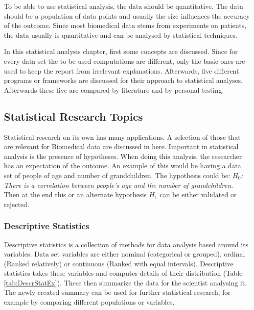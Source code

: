 \documentclass[10pt,a4paper]{report}
\begin{document}
	To be able to use statistical analysis, the data should be quantitative. The data should be a population of data points and usually the size influences the accuracy of the outcome. Since most biomedical data stems from experiments on patients, the data usually is quantitative and can be analysed by statistical techniques. \cite{sapsford2006data}
	
	In this statistical analysis chapter, first some concepts are discussed. 
	Since for every data set the to be used computations are different, only 
	the basic ones are used to keep the report from irrelevant explanations. 
	Afterwards, five different programs or frameworks are discussed for their 
	approach to statistical analyses. Afterwards these five are compared by 
	literature and by personal testing.
	
	\clearpage
	
	\subsection{Statistical Research Topics}
	
	Statistical research on its own has many applications. A selection of those 
	that are relevant for Biomedical data are discussed in here. Important in 
	statistical analysis is the presence of hypotheses. When doing this 
	analysis, the researcher has an expectation of the outcome. An example of 
	this would be having a data set of people of age and number of 
	grandchildren. The hypothesis could be: \textit{$H_0$: There is a 
		correlation between people's age and the number of grandchildren.} Then at 
	the end this or an alternate hypothesis $H_1$ can be either validated or 
	rejected.\cite{heiberger2004statistical}
	
	\subsubsection{Descriptive Statistics}
	
	Descriptive statistics is a collection of methods for data analysis based around its variables. Data set variables are either nominal (categorical or grouped), ordinal (Ranked relatively) or continuous (Ranked with equal intervals). Descriptive statistics takes these variables and computes details of their distribution (Table \ref{tab:DescrStatEx}). \cite{FISHER200993} These then summarize the data for the scientist analysing it. The newly created summary can be used for further statistical research, for example by comparing different populations or variables. \cite{woolson2011statistical}
	
\end{document}
